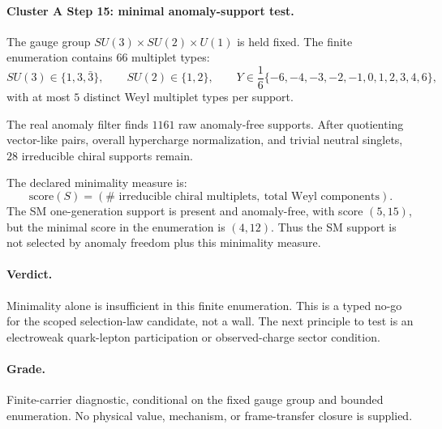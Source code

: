 \paragraph{Cluster A Step 15: minimal anomaly-support test.}

The gauge group \(SU(3)\times SU(2)\times U(1)\) is held fixed.  The finite
enumeration contains \(66\) multiplet types:
\[
SU(3)\in\{1,3,\bar 3\},\qquad SU(2)\in\{1,2\},\qquad
Y\in \frac{1}{6}\{-6,-4,-3,-2,-1,0,1,2,3,4,6\},
\]
with at most \(5\) distinct Weyl multiplet types per support.

The real anomaly filter finds \(1161\) raw anomaly-free supports.
After quotienting vector-like pairs, overall hypercharge normalization, and
trivial neutral singlets, \(28\) irreducible chiral supports remain.

The declared minimality measure is:
\[
\text{score}(S)=(\#\text{ irreducible chiral multiplets},\ \text{total Weyl components}).
\]
The SM one-generation support is present and anomaly-free, with score
\((5,15)\), but the minimal score in the enumeration is
\((4,12)\). Thus the SM support is not selected
by anomaly freedom plus this minimality measure.

\paragraph{Verdict.}
Minimality alone is insufficient in this finite enumeration.  This is a typed
no-go for the scoped selection-law candidate, not a wall.  The next principle to
test is an electroweak quark-lepton participation or observed-charge sector
condition.

\paragraph{Grade.}
Finite-carrier diagnostic, conditional on the fixed gauge group and bounded
enumeration.  No physical value, mechanism, or frame-transfer closure is supplied.
